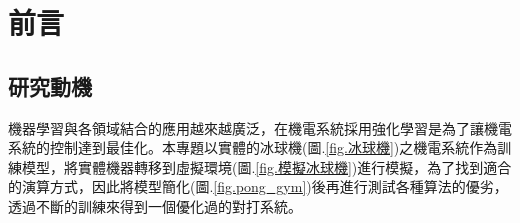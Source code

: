 \documentclass[14pt,a4paper]{report}  %
\begin{document}
\chapter{前言}
\renewcommand{\baselinestretch}{10.0} %
\setcounter{page}{1}  %
\fontsize{14pt}{2.5pt}\sectionef
\section{研究動機}
 機器學習與各領域結合的應用越來越廣泛，在機電系統採用強化學習是為了讓機電系統的控制達到最佳化。本專題以實體的冰球機(圖.\ref{fig.冰球機})之機電系統作為訓練模型，將實體機器轉移到虛擬環境(圖.\ref{fig.模擬冰球機})進行模擬，為了找到適合的演算方式，因此將模型簡化(圖.\ref{fig.pong_gym})後再進行測試各種算法的優劣，透過不斷的訓練來得到一個優化過的對打系統。\\
\end{document}
